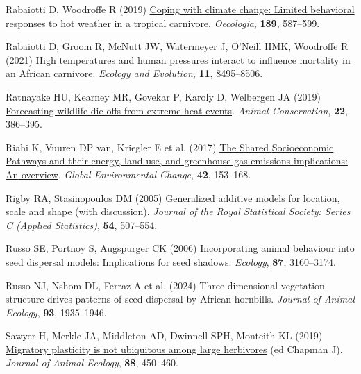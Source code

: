 \documentclass[
  12pt,
]{article}
\newlength{\cslhangindent}
\newenvironment{CSLReferences}[2] %
 {\begin{list}{}{%
  \setlength{\itemindent}{0pt}
  \setlength{\leftmargin}{0pt}
  \setlength{\parsep}{0pt}
  \ifodd #1
   \setlength{\leftmargin}{\cslhangindent}
   \setlength{\itemindent}{-1\cslhangindent}
  \fi
  \setlength{\itemsep}{#2\baselineskip}}}
 {\end{list}}
\begin{document}
\begin{CSLReferences}{1}{0}
Rabaiotti D, Woodroffe R (2019) \href{https://doi.org/10.1007/s00442-018-04329-1}{Coping with climate change: Limited behavioral responses to hot weather in a tropical carnivore}. \emph{Oecologia}, \textbf{189}, 587--599.

Rabaiotti D, Groom R, McNutt JW, Watermeyer J, O'Neill HMK, Woodroffe R (2021) \href{https://doi.org/10.1002/ece3.7601}{High temperatures and human pressures interact to influence mortality in an {African} carnivore}. \emph{Ecology and Evolution}, \textbf{11}, 8495--8506.

Ratnayake HU, Kearney MR, Govekar P, Karoly D, Welbergen JA (2019) \href{https://doi.org/10.1111/acv.12476}{Forecasting wildlife die‐offs from extreme heat events}. \emph{Animal Conservation}, \textbf{22}, 386--395.

Riahi K, Vuuren DP van, Kriegler E et al. (2017) \href{https://doi.org/10.1016/j.gloenvcha.2016.05.009}{The {Shared} {Socioeconomic} {Pathways} and their energy, land use, and greenhouse gas emissions implications: {An} overview}. \emph{Global Environmental Change}, \textbf{42}, 153--168.

Rigby RA, Stasinopoulos DM (2005) \href{https://doi.org/10.1111/j.1467-9876.2005.00510.x}{Generalized additive models for location, scale and shape (with discussion)}. \emph{Journal of the Royal Statistical Society: Series C (Applied Statistics)}, \textbf{54}, 507--554.

Russo SE, Portnoy S, Augspurger CK (2006) Incorporating animal behaviour into seed dispersal models: Implications for seed shadows. \emph{Ecology}, \textbf{87}, 3160--3174.

Russo NJ, Nshom DL, Ferraz A et al. (2024) Three-dimensional vegetation structure drives patterns of seed dispersal by {African} hornbills. \emph{Journal of Animal Ecology}, \textbf{93}, 1935--1946.

Sawyer H, Merkle JA, Middleton AD, Dwinnell SPH, Monteith KL (2019) \href{https://doi.org/10.1111/1365-2656.12926}{Migratory plasticity is not ubiquitous among large herbivores} (ed Chapman J). \emph{Journal of Animal Ecology}, \textbf{88}, 450--460.


\end{CSLReferences}
\end{document}
